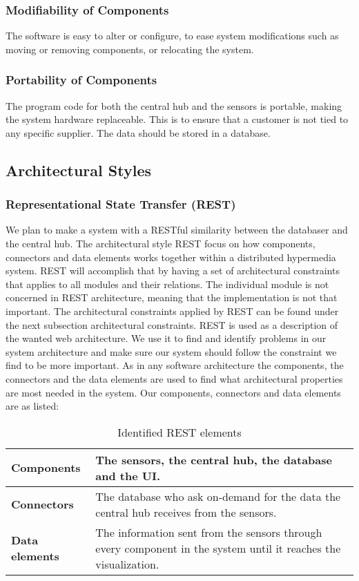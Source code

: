 \documentclass[../document.tex]{subfiles}
\begin{document}
\subsubsection{Modifiability of Components}
The software is easy to alter or configure, to ease system modifications such as moving or removing components, or relocating the system.

\subsubsection{Portability of Components}
The program code for both the central hub and the sensors is portable, making the system hardware replaceable. This is to ensure that a customer is not tied to any specific supplier. The data should be stored in a database.

\subsection{Architectural Styles}
\subsubsection{Representational State Transfer (REST)}
We plan to make a system with a RESTful similarity between the databaser and the central hub. The architectural style REST focus on how components, connectors and data elements works together within a distributed hypermedia system. REST will accomplish that by having a set of architectural constraints that applies to all modules and their relations. The individual module is not concerned in REST architecture, meaning that the implementation is not that important. The architectural constraints applied by REST can be found under the next subsection architectural constraints. REST is used as a description of the wanted web architecture. We use it to find and identify problems in our system architecture and make sure our system should follow the constraint we find to be more important. As in any software architecture the components, the connectors and the data elements are used to find what architectural properties are most needed in the system. Our components, connectors and data elements are as listed:

\begin{table}[H]
	\caption{Identified REST elements}
	\begin{tabularx}{\textwidth}{|X|X|}
		\hline
		\textbf{Components}		& The sensors, the central hub, the database and the UI.  \\ \hline
		\textbf{Connectors}		& The database who ask on-demand for the data the central hub receives from the sensors.  \\ \hline
		\textbf{Data elements}	& The information sent from the sensors through every component in the system until it reaches  the visualization.  \\ \hline
	\end{tabularx}
\end{table}
\end{document}
